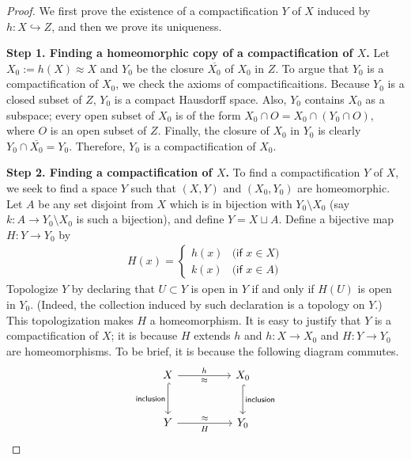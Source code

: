 \begin{proof}
    We first prove the existence of a compactification $Y$ of $X$ induced by $h: X\hookrightarrow Z$, and then we prove its uniqueness.

    \indent\textbf{Step 1. Finding a homeomorphic copy of a compactification of $X$.}\newline
    Let $X_0:=h(X)\approx X$ and $Y_0$ be the closure $\overline{X_0}$ of $X_0$ in $Z$.
    To argue that $Y_0$ is a compactification of $X_0$, we check the axioms of compactificaitions.
    Because $Y_0$ is a closed subset of $Z$, $Y_0$ is a compact Hausdorff space.
    Also, $Y_0$ contains $X_0$ as a subspace; every open subset of $X_0$ is of the form $X_0\cap O=X_0\cap(Y_0\cap O)$, where $O$ is an open subset of $Z$.
    Finally, the closure of $X_0$ in $Y_0$ is clearly $Y_0\cap\overline{X_0}=Y_0$.
    Therefore, $Y_0$ is a compactification of $X_0$.
            
    \indent\textbf{Step 2. Finding a compactification of $X$.}\newline
    To find a compactification $Y$ of $X$, we seek to find a space $Y$ such that $(X, Y)$ and $(X_0, Y_0)$ are homeomorphic.
    Let $A$ be any set disjoint from $X$ which is in bijection with $Y_0\setminus X_0$ (say $k: A\rightarrow Y_0\setminus X_0$ is such a bijection), and define $Y=X\sqcup A$.
    Define a bijective map $H: Y\rightarrow Y_0$ by
    \begin{align*}
        H(x)=\left\{
            \begin{array}{cc}
                h(x)    &   \textsf{(if $x\in X$)}\\
                k(x)    &   \textsf{(if $x\in A$)}
            \end{array}
        \right.
    \end{align*}
    Topologize $Y$ by declaring that $U\subset Y$ is open in $Y$ if and only if $H(U)$ is open in $Y_0$. (Indeed, the collection induced by such declaration is a topology on $Y$.)
    This topologization makes $H$ a homeomorphism.
    It is easy to justify that $Y$ is a compactification of $X$; it is because $H$ extends $h$ and $h: X\rightarrow X_0$ and $H: Y\rightarrow Y_0$ are homeomorphisms.
    To be brief, it is because the following diagram commutes.
    \begin{equation*}
        \begin{tikzcd}[row sep=large, column sep=huge]
            X\arrow[r, "h", "\approx"']\arrow[d, "\textsf{inclusion}"', hook]
            &
            X_0\arrow[d, "\textsf{inclusion}", hook]\\
            Y\arrow[r, "\approx", "H"'] & Y_0
        \end{tikzcd}
    \end{equation*}
    

\end{proof}
